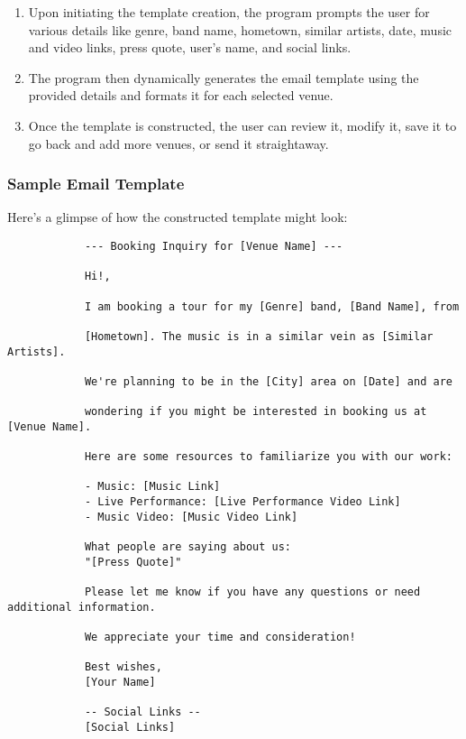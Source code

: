 \documentclass{article}
\begin{document}
	\begin{enumerate}
		\item Upon initiating the template creation, the program prompts the user for various details like genre, band name, hometown, similar artists, date, music and video links, press quote, user's name, and social links.
		\item The program then dynamically generates the email template using the provided details and formats it for each selected venue.
		\item Once the template is constructed, the user can review it, modify it, save it to go back and add more venues, or send it straightaway.
	\end{enumerate}

\newpage
	\subsubsection*{Sample Email Template}
	Here's a glimpse of how the constructed template might look:

	\begin{mdframed}[backgroundcolor=background, hidealllines=false, innerleftmargin=15pt, innerrightmargin=5pt, innertopmargin=0pt, innerbottommargin=-5pt, linecolor=accent]
		\begin{lstlisting}
			--- Booking Inquiry for [Venue Name] ---
			
			Hi!,
			
			I am booking a tour for my [Genre] band, [Band Name], from 
			
			[Hometown]. The music is in a similar vein as [Similar Artists].
			
			We're planning to be in the [City] area on [Date] and are
			
			wondering if you might be interested in booking us at [Venue Name].
			
			Here are some resources to familiarize you with our work:
			
			- Music: [Music Link]
			- Live Performance: [Live Performance Video Link]
			- Music Video: [Music Video Link]
			
			What people are saying about us:
			"[Press Quote]"
			
			Please let me know if you have any questions or need additional information.
			
			We appreciate your time and consideration!
			
			Best wishes,
			[Your Name]
			
			-- Social Links --
			[Social Links]
		\end{lstlisting}
	\end{mdframed}
		
\end{document}

